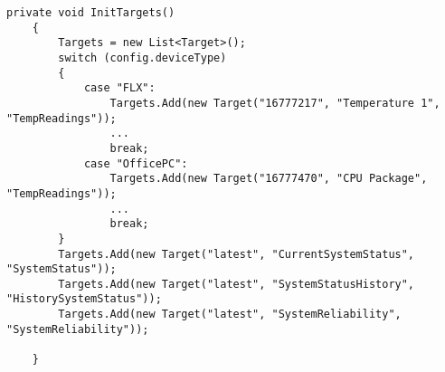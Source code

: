 \begin{lstlisting}[caption={InitTargets Funktino der DataBaseAPI}, label={lst:InitTargets}]
    private void InitTargets()
    {
        Targets = new List<Target>();
        switch (config.deviceType)
        {
            case "FLX":
                Targets.Add(new Target("16777217", "Temperature 1", "TempReadings"));
                ...
                break;
            case "OfficePC":
                Targets.Add(new Target("16777470", "CPU Package", "TempReadings"));
                ...
                break;
        }
        Targets.Add(new Target("latest", "CurrentSystemStatus", "SystemStatus"));
        Targets.Add(new Target("latest", "SystemStatusHistory", "HistorySystemStatus"));
        Targets.Add(new Target("latest", "SystemReliability", "SystemReliability"));

    }
\end{lstlisting}
